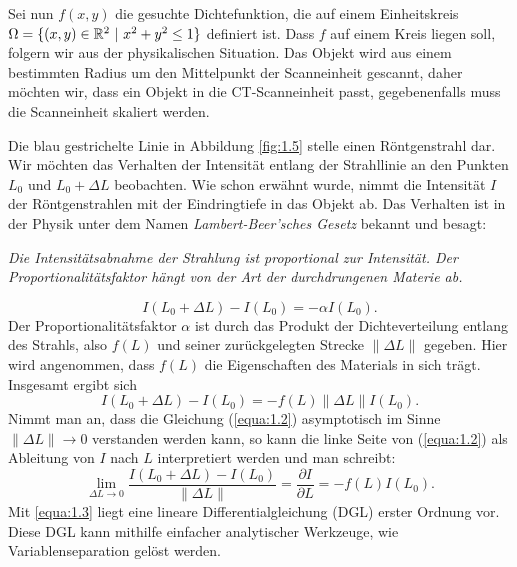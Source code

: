 Sei nun $f(x,y)$ die gesuchte Dichtefunktion, die auf einem Einheitskreis $\Omega = \{ (x,y) \in \mathbb{R}^2 \ | \ x^2 + y^2 \leq 1 \}$ definiert ist. Dass $f$ auf einem Kreis liegen soll, folgern wir aus der physikalischen Situation. Das Objekt wird aus einem bestimmten Radius um den Mittelpunkt der Scanneinheit gescannt, daher möchten wir, dass ein Objekt in die CT-Scanneinheit passt, gegebenenfalls muss die Scanneinheit skaliert werden.

Die blau gestrichelte Linie in Abbildung \ref{fig:1.5} stelle einen Röntgenstrahl dar. Wir möchten das Verhalten der Intensität entlang der Strahllinie an den Punkten $L_0$ und $L_0 + \Delta L$ beobachten. Wie schon erwähnt wurde, nimmt die Intensität $I$ der Röntgenstrahlen mit der Eindringtiefe in das Objekt ab. Das Verhalten ist in der Physik unter dem Namen \textit{Lambert-Beer’sches Gesetz} bekannt und besagt:
\begin{center}
	\textit{Die Intensitätsabnahme der Strahlung ist proportional zur Intensität. Der Proportionalitätsfaktor hängt von der Art der durchdrungenen Materie ab.}
\end{center}
\begin{equation}
	I(L_0 + \Delta L) - I(L_0) = - \alpha I(L_0).
	\label{equa:1.1}
\end{equation}
Der Proportionalitätsfaktor $\alpha$ ist durch das Produkt der Dichteverteilung entlang des Strahls, also $f(L)$ und seiner zurückgelegten Strecke $\parallel \Delta L\parallel$ gegeben. Hier wird angenommen, dass $f(L)$ die Eigenschaften des Materials in sich trägt. Insgesamt ergibt sich
\begin{equation}
	I(L_0 + \Delta L) - I(L_0) = -f(L) \parallel \Delta L \parallel I(L_0).
	\label{equa:1.2}
\end{equation}
Nimmt man an, dass die Gleichung (\ref{equa:1.2}) asymptotisch im Sinne $\parallel \Delta L \parallel \rightarrow 0$ verstanden werden kann, so kann die linke Seite von (\ref{equa:1.2}) als Ableitung von $I$ nach $L$ interpretiert werden und man schreibt:
\begin{equation}
	\lim_{\Delta L\rightarrow 0}\frac{I(L_0 + \Delta L) - I(L_0)}{\parallel \Delta L \parallel} = \frac{\partial I}{\partial L} = -f(L)I(L_0).
	\label{equa:1.3}
\end{equation}
Mit \ref{equa:1.3} liegt eine lineare Differentialgleichung (DGL) erster Ordnung vor. Diese DGL kann mithilfe einfacher analytischer Werkzeuge, wie Variablenseparation gelöst werden. 

